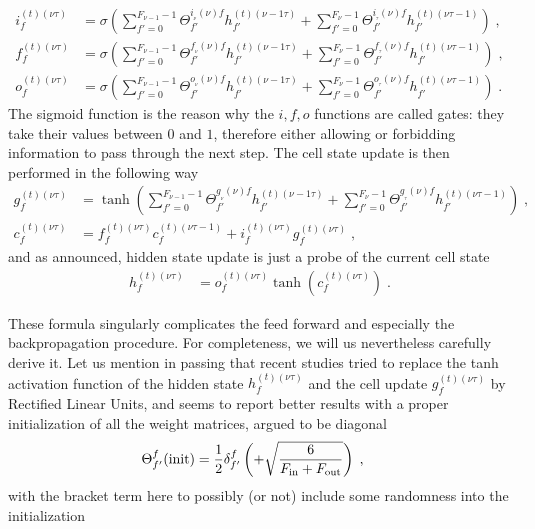 \begin{align}
i^{(t)(\nu\tau)}_f&=\sigma\left(\sum_{f'=0}^{F_{{\nu-1}}-1}\Theta^{i_{_\nu}(\nu)f}_{f'}
%
h^{(t)(\nu-1\tau)}_{f'}+\sum_{f'=0}^{F{_{\nu}}-1}\Theta^{i_{_\tau}(\nu)f}_{f'}
%
h^{(t)(\nu\tau-1)}_{f'}\right)\;,\\
%
f^{(t)(\nu\tau)}_f&=\sigma\left(\sum_{f'=0}^{F{_{\nu-1}}-1}\Theta^{f_{_\nu}(\nu)f}_{f'}
%
h^{(t)(\nu-1\tau)}_{f'}+\sum_{f'=0}^{F_{{\nu}}-1}\Theta^{f_{_\tau}(\nu)f}_{f'}
%
h^{(t)(\nu\tau-1)}_{f'}\right)\;,\\
%
o^{(t)(\nu\tau)}_f&=\sigma\left(\sum_{f'=0}^{F_{{\nu-1}}-1}\Theta^{o_{_\nu}(\nu)f}_{f'}
%
h^{(t)(\nu-1\tau)}_{f'}+\sum_{f'=0}^{F_{{\nu}}-1}\Theta^{o_{_\tau}(\nu)f}_{f'}
%
h^{(t)(\nu\tau-1)}_{f'}\right)\;.
\end{align}
The sigmoid function is the reason why the $i,f,o$ functions are called gates: they take their values between $0$ and $1$, therefore either allowing or forbidding information to pass through the next step. The cell state update is then performed in the following way
\begin{align}
g^{(t)(\nu\tau)}_f&=\tanh\left(\sum_{f'=0}^{F_{{\nu-1}}-1}\Theta^{g_{_\nu}(\nu)f}_{f'}
%
h^{(t)(\nu-1\tau)}_{f'}+\sum_{f'=0}^{F_{{\nu}}-1}\Theta^{g_{_\tau}(\nu)f}_{f'}
%
h^{(t)(\nu\tau-1)}_{f'}\right)\;,\\
%
c^{(t)(\nu\tau)}_{f}&=
%
f^{(t)(\nu\tau)}_{f}c^{(t)(\nu\tau-1)}_{f}+i^{(t)(\nu\tau)}_{f}g^{(t)(\nu\tau)}_{f}\;,
\end{align}
and as announced, hidden state update is just a probe of the current cell state
\begin{align}
h^{(t)(\nu\tau)}_{f}&=o^{(t)(\nu\tau)}_{f}\tanh \left(c^{(t)(\nu\tau)}_{f}\right)\;.
\end{align}

These formula singularly complicates the feed forward and especially the backpropagation procedure. For completeness, we will us nevertheless carefully derive it. Let us mention in passing that recent studies tried to replace the tanh activation function of the hidden state $h^{(t)(\nu\tau)}_{f}$ and the cell update $g^{(t)(\nu\tau)}_f$ by Rectified Linear Units, and seems to report better results with a proper initialization of all the weight matrices, argued to be diagonal
\begin{align}
\Theta^f_{f'}(\text{init})&=\frac12\delta^f_{f'}\left(+\sqrt{\frac{6}{F_{\rm in}+F_{\rm out}}}\right)\;,
\end{align}
with the bracket term here to possibly (or not) include some randomness into the initialization

